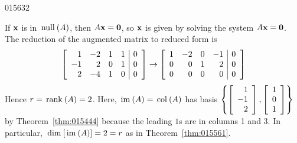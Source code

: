 {{\begin{example}{}{015632}
\begin{solution}
If $\textbf{x}$ is in $\thinspace\operatorname{null\medspace}(A)$, then $A\textbf{x} = \textbf{0}$, so $\textbf{x}$ is given by solving the system $A\textbf{x} = \textbf{0}$. The reduction of the augmented matrix to reduced form is
\begin{equation*}
\left[ \begin{array}{rrrr|r}
1 & -2 & 1 & 1 & 0 \\
-1 & 2 & 0 & 1 & 0 \\
2 & -4 & 1 & 0 & 0
\end{array} \right]
\rightarrow
\left[ \begin{array}{rrrr|r}
1 & -2 & 0 & -1 & 0 \\
0 &  0 & 1 &  2 & 0 \\
0 &  0 & 0 &  0 & 0 
\end{array} \right]
\end{equation*}
Hence $r = \thinspace\operatorname{rank\medspace}(A) = 2$. Here, $\thinspace\operatorname{im\medspace}(A) = \thinspace\operatorname{col\medspace}(A)$ has basis 
$\left\{
\left[ \begin{array}{r}
1\\
-1\\
2
\end{array} \right], \left[ \begin{array}{r}
1\\
0\\
1
\end{array} \right]
\right\}$ by Theorem~\ref{thm:015444} because the leading $1$s are in columns 1 and 3. In particular, $\thinspace\operatorname{dim\medspace}[\thinspace\operatorname{im\medspace}(A)] = 2 = r$ as in Theorem~\ref{thm:015561}.


\end{solution}
\end{example}}}
